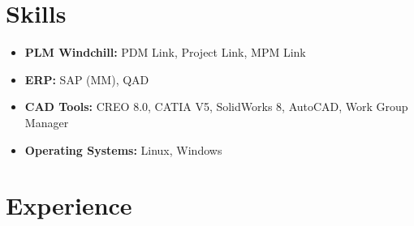 \documentclass[letterpaper]{twentysecondcv} %
\begin{document}
\section{Skills}
\begin{itemize}
    \item \textbf{PLM Windchill:} PDM Link, Project Link, MPM Link
    \item \textbf{ERP:} SAP (MM), QAD
    \item \textbf{CAD Tools:} CREO 8.0, CATIA V5, SolidWorks 8, AutoCAD, Work Group Manager
    \item \textbf{Operating Systems:} Linux, Windows
\end{itemize}



\section{Experience}
\end{document}
